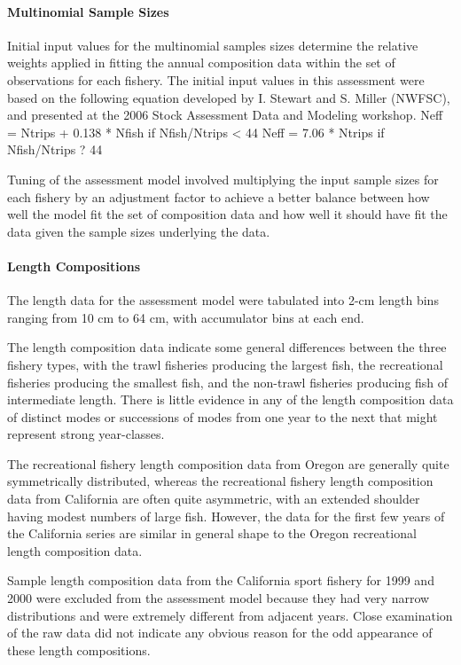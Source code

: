 \documentclass[11pt,
  english,
  letterpaper,
]{article}
\begin{document}
\hypertarget{multinomial-sample-sizes}{%
\paragraph{Multinomial Sample Sizes}\label{multinomial-sample-sizes}}

Initial input values for the multinomial samples sizes determine the relative weights applied in fitting the annual composition data within the set of observations for each fishery. The initial input values in this assessment were based on the following equation developed by I. Stewart and S. Miller (NWFSC), and presented at the 2006 Stock Assessment Data and Modeling workshop. Neff = Ntrips + 0.138 * Nfish if Nfish/Ntrips \textless{} 44 Neff = 7.06 * Ntrips if Nfish/Ntrips ? 44

Tuning of the assessment model involved multiplying the input sample sizes for each fishery by an adjustment factor to achieve a better balance between how well the model fit the set of composition data and how well it should have fit the data given the sample sizes underlying the data.

\hypertarget{length-compositions}{%
\paragraph{Length Compositions}\label{length-compositions}}

The length data for the assessment model were tabulated into 2-cm length bins ranging from 10 cm to 64 cm, with accumulator bins at each end.

The length composition data indicate some general differences between the three fishery types, with the trawl fisheries producing the largest fish, the recreational fisheries producing the smallest fish, and the non-trawl fisheries producing fish of intermediate length. There is little evidence in any of the length composition data of distinct modes or successions of modes from one year to the next that might represent strong year-classes.

The recreational fishery length composition data from Oregon are generally quite symmetrically distributed, whereas the recreational fishery length composition data from California are often quite asymmetric, with an extended shoulder having modest numbers of large fish. However, the data for the first few years of the California series are similar in general shape to the Oregon recreational length composition data.

Sample length composition data from the California sport fishery for 1999 and 2000 were excluded from the assessment model because they had very narrow distributions and were extremely different from adjacent years. Close examination of the raw data did not indicate any obvious reason for the odd appearance of these length compositions.
\end{document}

